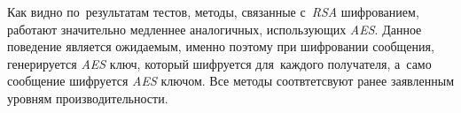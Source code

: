 Как видно по~результатам тестов, методы, связанные с~\textit{RSA} шифрованием, работают значительно медленнее аналогичных, использующих \textit{AES}. Данное поведение является ожидаемым, именно поэтому при шифровании сообщения, генерируется \textit{AES} ключ, который шифруется для~каждого получателя, а~само сообщение шифруется \textit{AES} ключом. Все методы соотвтетсвуют ранее заявленным уровням производительности.
